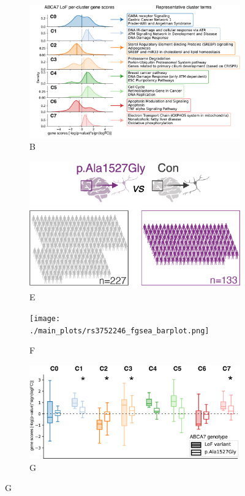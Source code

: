 \begin{figure}[H]
\begin{subfigure}[t]{0.47\textwidth}
    \end{subfigure}
    \begin{subfigure}[t]{0.45\textwidth}
        \caption{B}
        \includegraphics[width=\textwidth]{./main_plots/kl_densities.png}        
    \end{subfigure}
    \begin{subfigure}[t]{0.3\textwidth}
        \caption{E}
        \includegraphics[width=\textwidth]{./main_plots/common_var_cohort_cartoon.png}        
    \end{subfigure}
    \hspace{0.01\textwidth} %
    \begin{subfigure}[t]{0.225\textwidth}
        \caption{F}
        \texttt{[image: ./main\_plots/rs3752246\_fgsea\_barplot.png]}        
    \end{subfigure}
    \begin{subfigure}[t]{0.45\textwidth}
        \caption{G}
        \includegraphics[width=\textwidth]{./main_plots/common_var_distributions.png}        

\end{subfigure}
\end{figure}
